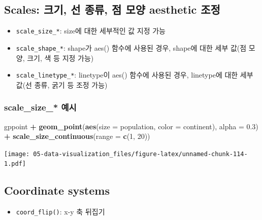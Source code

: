 \documentclass[
  11pt,
]{krantz}
\newenvironment{Shaded}{\begin{snugshade}}{\end{snugshade}}
\newcommand{\DataTypeTok}[1]{\textcolor[rgb]{0.27,0.27,0.27}{#1}}
\newcommand{\DecValTok}[1]{\textcolor[rgb]{0.06,0.06,0.06}{#1}}
\newcommand{\FloatTok}[1]{\textcolor[rgb]{0.06,0.06,0.06}{#1}}
\newcommand{\KeywordTok}[1]{\textcolor[rgb]{0.27,0.27,0.27}{\textbf{#1}}}
\newcommand{\NormalTok}[1]{#1}
\newcommand{\OperatorTok}[1]{\textcolor[rgb]{0.43,0.43,0.43}{\textbf{#1}}}
\newcommand{\StringTok}[1]{\textcolor[rgb]{0.5,0.5,0.5}{#1}}
\providecommand{\tightlist}{%
  \setlength{\itemsep}{0pt}\setlength{\parskip}{0pt}}
\begin{document}
\hypertarget{scale-size-line-shape}{%
\subsection{Scales: 크기, 선 종류, 점 모양 aesthetic 조정}\label{scale-size-line-shape}}

\begin{itemize}
\tightlist
\item
  \texttt{scale\_size\_*}: size에 대한 세부적인 값 지정 가능
\item
  \texttt{scale\_shape\_*}: shape가 aes() 함수에 사용된 경우, shape에 대한 세부 값(점 모양, 크기, 색 등 지정 가능)
\item
  \texttt{scale\_linetype\_*}: linetype이 aes() 함수에 사용된 경우, linetype에 대한 세부 값(선 종류, 굵기 등 조정 가능)
\end{itemize}

\hypertarget{scale_size_-uxc608uxc2dc}{%
\subsubsection{scale\_size\_* 예시}\label{scale_size_-uxc608uxc2dc}}

\footnotesize

\begin{Shaded}
\begin{Highlighting}[]
\NormalTok{gppoint }\OperatorTok{+}\StringTok{ }
\StringTok{  }\KeywordTok{geom_point}\NormalTok{(}\KeywordTok{aes}\NormalTok{(}\DataTypeTok{size =}\NormalTok{ population, }
                 \DataTypeTok{color =}\NormalTok{ continent), }
             \DataTypeTok{alpha =} \FloatTok{0.3}\NormalTok{) }\OperatorTok{+}\StringTok{ }
\StringTok{  }\KeywordTok{scale_size_continuous}\NormalTok{(}\DataTypeTok{range =} \KeywordTok{c}\NormalTok{(}\DecValTok{1}\NormalTok{, }\DecValTok{20}\NormalTok{))}
\end{Highlighting}
\end{Shaded}

\texttt{[image: 05-data-visualization\_files/figure-latex/unnamed-chunk-114-1.pdf]}

\normalsize

\hypertarget{coordinate-systems}{%
\subsection{Coordinate systems}\label{coordinate-systems}}

\begin{itemize}
\tightlist
\item
  \texttt{coord\_flip()}: x-y 축 뒤집기
\end{itemize}
\end{document}
